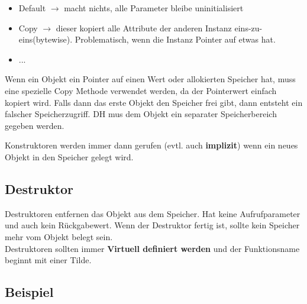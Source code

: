 \begin{itemize}[itemsep=1pt, parsep=0pt]
    \item Default $\rightarrow$ macht nichts, alle Parameter bleibe uninitialisiert
    \item Copy $\rightarrow$ dieser kopiert alle Attribute der anderen Instanz eins-zu-eins(bytewise). Problematisch, wenn die Instanz Pointer auf etwas hat.
    \item ...
\end{itemize}

Wenn ein Objekt ein Pointer auf einen Wert oder allokierten Speicher hat, muss eine spezielle Copy Methode verwendet werden, da der Pointerwert einfach kopiert wird.
Falls dann das erste Objekt den Speicher frei gibt, dann entsteht ein falscher Speicherzugriff.
DH mus dem Objekt ein separater Speicherbereich gegeben werden. 

Konstruktoren werden immer dann gerufen (evtl. auch \textbf{implizit}) wenn ein neues Objekt in den Speicher gelegt wird.\\

\subsection{Destruktor}

Destruktoren entfernen das Objekt aus dem Speicher. 
Hat keine Aufrufparameter und auch kein Rückgabewert.
Wenn der Destruktor fertig ist, sollte kein Speicher mehr vom Objekt belegt sein.\\
Destruktoren sollten immer \textbf{Virtuell definiert werden} und der Funktionsname beginnt mit einer Tilde.

\nextcol

\subsection{Beispiel}


